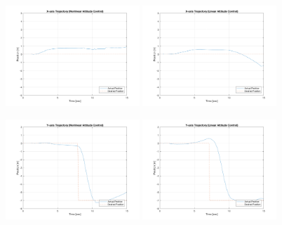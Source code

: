 \begin{figure}
    \centering
    \includegraphics[width=0.45\textwidth]{graphics/experiment_plots/roll_minus_non_position_x.png}
    \includegraphics[width=0.45\textwidth]{graphics/experiment_plots/roll_minus_pid_position_x.png}
    
    \includegraphics[width=0.45\textwidth]{graphics/experiment_plots/roll_minus_non_position_y.png}
    \includegraphics[width=0.45\textwidth]{graphics/experiment_plots/roll_minus_pid_position_y.png}
    

\end{figure}
